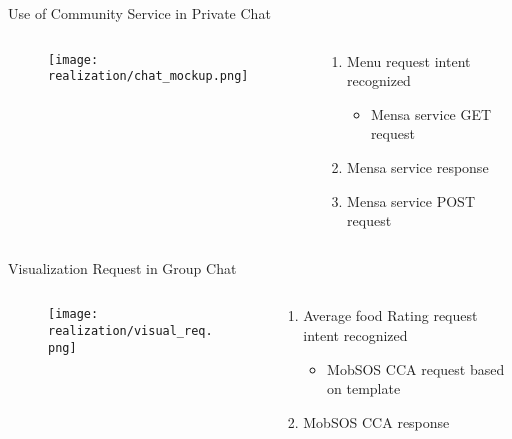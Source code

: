 \begin{frame}{Use of Community Service in Private Chat}
  \begin{columns}
    \begin{column}[]{0.6\textwidth}
      \begin{figure}
        \centering
        \texttt{[image: realization/chat\_mockup.png]}

      \end{figure}
    \end{column}
    \begin{column}[]{0.4\textwidth}
      \begin{enumerate}
        \item Menu request intent recognized
              \begin{itemize}
                \item Mensa service GET request
              \end{itemize}
        \item Mensa service response
        \item Mensa service POST request
      \end{enumerate}
    \end{column}
  \end{columns}

\end{frame}

\begin{frame}{Visualization Request in Group Chat}
  \begin{columns}
    \begin{column}[]{0.5\textwidth}
      \begin{figure}
        \centering
        \texttt{[image: realization/visual\_req.png]}
      \end{figure}
    \end{column}
    \begin{column}[]{0.5\textwidth}
      \begin{enumerate}
        \item Average food Rating request intent recognized
              \begin{itemize}
                \item MobSOS CCA request based on template
              \end{itemize}
        \item MobSOS CCA response
      \end{enumerate}
    \end{column}
  \end{columns}
\end{frame}

